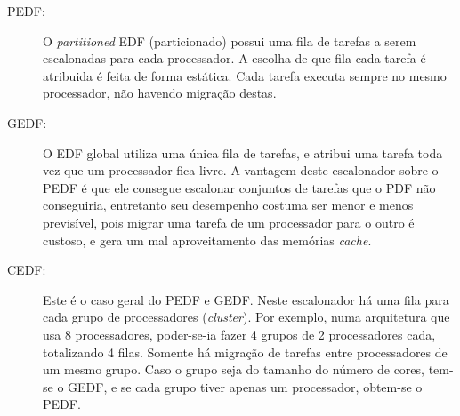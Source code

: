 \begin{description}

\item[PEDF:] O \emph{partitioned} EDF (particionado) possui uma fila de tarefas a serem escalonadas para cada processador. A escolha de que fila cada tarefa é atribuida é feita de forma estática. Cada tarefa executa sempre no mesmo processador, não havendo migração destas. 

\item[GEDF:] O EDF global utiliza uma única fila de tarefas, e atribui uma tarefa toda vez que um processador fica livre. A vantagem deste escalonador sobre o PEDF é que ele consegue escalonar conjuntos de tarefas que o PDF não conseguiria, entretanto seu desempenho costuma ser menor e menos previsível, pois migrar uma tarefa de um processador para o outro é custoso, e gera um mal aproveitamento das memórias \emph{cache}.

\item[CEDF:] Este é o caso geral do PEDF e GEDF. Neste escalonador há uma fila para cada grupo de processadores (\emph{cluster}). Por exemplo, numa arquitetura que usa 8 processadores, poder-se-ia fazer 4 grupos de 2 processadores cada, totalizando 4 filas. Somente há migração de tarefas entre processadores de um mesmo grupo. Caso o grupo seja do tamanho do número de cores, tem-se o GEDF, e se cada grupo tiver apenas um processador, obtem-se o PEDF.

\end{description}



















